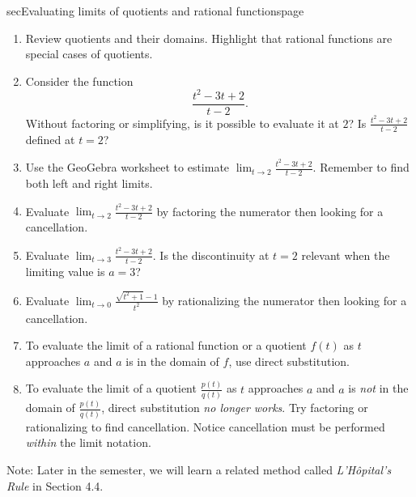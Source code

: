 \documentclass[../main.tex]{subfiles}
\begin{document}
\begin{outline}{sec}{Evaluating limits of quotients and rational functions}{page}

  \begin{enumerate}
    \item Review quotients and their domains. Highlight that rational functions are special cases of quotients.
    \item Consider the function \[\frac{t^{2} - 3t + 2}{t-2}.\] Without factoring or simplifying, is it possible to evaluate it at \(2\)? Is \(\frac{t^{2} - 3t + 2}{t-2}\) defined at \(t = 2\)?
    \item Use the GeoGebra worksheet to estimate \({\lim_{t \to 2}} \frac{t^{2} - 3t + 2}{t-2}\). Remember to find both left and right limits.
    \item Evaluate \({\lim_{t \to 2}} \frac{t^{2} - 3t + 2}{t-2}\) by factoring the numerator then looking for a cancellation.
    \item Evaluate \({\lim_{t \to 3}} \frac{t^{2} - 3t + 2}{t-2}\). Is the discontinuity at \(t = 2\) relevant when the limiting value is \(a = 3\)?
    \item Evaluate \({\lim_{t \to 0}} \frac{\sqrt{t^{2} + 1} - 1}{t^{2}}\) by rationalizing the numerator then looking for a cancellation.
    \item To evaluate the limit of a rational function or a quotient \(f(t)\) as \(t\) approaches \(a\) and \(a\) is in the domain of \(f\), use direct substitution.
    \item To evaluate the limit of a quotient \(\frac{p(t)}{q(t)}\) as \(t\) approaches \(a\) and \(a\) is \emph{not} in the domain of \(\frac{p(t)}{q(t)}\), direct substitution \emph{no longer works}. Try factoring or rationalizing to find cancellation. Notice cancellation must be performed \emph{within} the limit notation.
  \end{enumerate}
  Note: Later in the semester, we will learn a related method called \textit{L'H{\^o}pital's Rule} in Section 4.4.
\end{outline}
\end{document}
